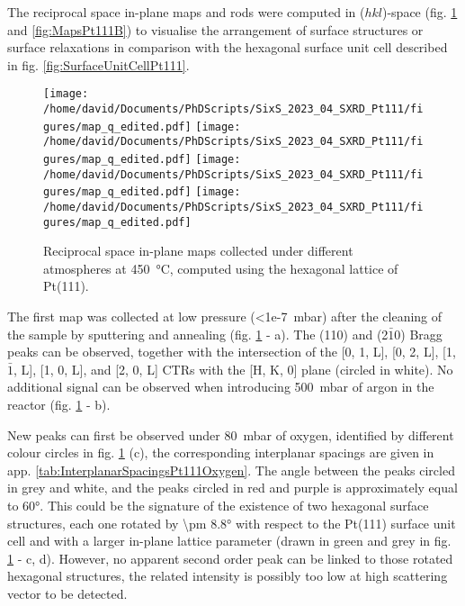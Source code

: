 The reciprocal space in-plane maps and rods were computed in ($hkl$)-space (fig. \ref{fig:MapsPt111A} and \ref{fig:MapsPt111B}) to visualise the arrangement of surface structures or surface relaxations in comparison with the hexagonal surface unit cell described in fig. \ref{fig:SurfaceUnitCellPt111}.

\begin{figure}[!htb]
    \centering
    \texttt{[image: /home/david/Documents/PhDScripts/SixS\_2023\_04\_SXRD\_Pt111/figures/map\_q\_edited.pdf]}
    \texttt{[image: /home/david/Documents/PhDScripts/SixS\_2023\_04\_SXRD\_Pt111/figures/map\_q\_edited.pdf]}
    \texttt{[image: /home/david/Documents/PhDScripts/SixS\_2023\_04\_SXRD\_Pt111/figures/map\_q\_edited.pdf]}
    \texttt{[image: /home/david/Documents/PhDScripts/SixS\_2023\_04\_SXRD\_Pt111/figures/map\_q\_edited.pdf]}
    \caption{
        Reciprocal space in-plane maps collected under different atmospheres at \qty{450}{\degreeCelsius}, computed using the hexagonal lattice of Pt(111).
    }
    \label{fig:MapsPt111A}
\end{figure}

The first map was collected at low pressure (\qty{<1e-7}{\milli\bar}) after the cleaning of the sample by sputtering and annealing (fig. \ref{fig:MapsPt111A} - a).
The (110) and (2$\bar{1}$0) Bragg peaks can be observed, together with the intersection of the [0, 1, L], [0, 2, L], [1, $\bar{1}$, L], [1, 0, L], and [2, 0, L] CTRs with the [H, K, 0] plane (circled in white).
No additional signal can be observed when introducing \qty{500}{\milli\bar} of argon in the reactor (fig. \ref{fig:MapsPt111A} - b).

New peaks can first be observed under \qty{80}{\milli\bar} of oxygen, identified by different colour circles in fig. \ref{fig:MapsPt111A} (c), the corresponding interplanar spacings are given in app. \ref{tab:InterplanarSpacingsPt111Oxygen}.
The angle between the peaks circled in grey and white, and the peaks circled in red and purple is approximately equal to \ang{60}.
This could be the signature of the existence of two hexagonal surface structures, each one rotated by \ang{\pm 8.8} with respect to the Pt(111) surface unit cell and with a larger in-plane lattice parameter (drawn in green and grey in fig. \ref{fig:MapsPt111A} - c, d).
However, no apparent second order peak can be linked to those rotated hexagonal structures, the related intensity is possibly too low at high scattering vector to be detected.

